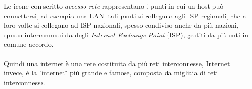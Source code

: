 \documentclass[12pt, letterpaper]{article}
\newcommand{\acc}{\\\hphantom{}\\}
\begin{document}
Le icone con scritto \textit{accesso rete} rappresentano i punti in cui un host può connettersi, ad esempio una LAN, tali punti si 
collegano agli ISP regionali, che a loro volte si collegano ad ISP nazionali, spesso condiviso anche da più nazioni, spesso 
interconnessi da degli \textit{Internet Exchange Point} (ISP), gestiti da più enti in comune accordo.\acc Quindi una 
internet è una rete costituita da più reti interconnesse, Internet invece, è la "internet" più grande e famose, composta da migliaia di reti 
interconnesse.
\end{document}
